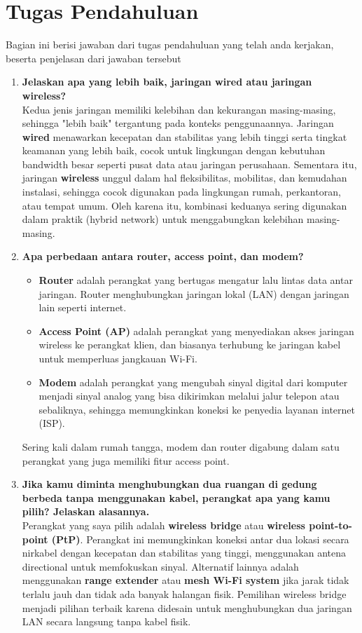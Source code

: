 \section{Tugas Pendahuluan}
Bagian ini berisi jawaban dari tugas pendahuluan yang telah anda kerjakan, beserta penjelasan dari jawaban tersebut
\begin{enumerate}
	\item \textbf{Jelaskan apa yang lebih baik, jaringan wired atau jaringan wireless?} \\
	Kedua jenis jaringan memiliki kelebihan dan kekurangan masing-masing, sehingga "lebih baik" tergantung pada konteks penggunaannya. Jaringan \textbf{wired} menawarkan kecepatan dan stabilitas yang lebih tinggi serta tingkat keamanan yang lebih baik, cocok untuk lingkungan dengan kebutuhan bandwidth besar seperti pusat data atau jaringan perusahaan. Sementara itu, jaringan \textbf{wireless} unggul dalam hal fleksibilitas, mobilitas, dan kemudahan instalasi, sehingga cocok digunakan pada lingkungan rumah, perkantoran, atau tempat umum. Oleh karena itu, kombinasi keduanya sering digunakan dalam praktik (hybrid network) untuk menggabungkan kelebihan masing-masing.

	\item \textbf{Apa perbedaan antara router, access point, dan modem?} \\
	\begin{itemize}
		\item \textbf{Router} adalah perangkat yang bertugas mengatur lalu lintas data antar jaringan. Router menghubungkan jaringan lokal (LAN) dengan jaringan lain seperti internet.
		\item \textbf{Access Point (AP)} adalah perangkat yang menyediakan akses jaringan wireless ke perangkat klien, dan biasanya terhubung ke jaringan kabel untuk memperluas jangkauan Wi-Fi.
		\item \textbf{Modem} adalah perangkat yang mengubah sinyal digital dari komputer menjadi sinyal analog yang bisa dikirimkan melalui jalur telepon atau sebaliknya, sehingga memungkinkan koneksi ke penyedia layanan internet (ISP).
	\end{itemize}
	Sering kali dalam rumah tangga, modem dan router digabung dalam satu perangkat yang juga memiliki fitur access point.

	\item \textbf{Jika kamu diminta menghubungkan dua ruangan di gedung berbeda tanpa menggunakan kabel, perangkat apa yang kamu pilih? Jelaskan alasannya.} \\
	Perangkat yang saya pilih adalah \textbf{wireless bridge} atau \textbf{wireless point-to-point (PtP)}. Perangkat ini memungkinkan koneksi antar dua lokasi secara nirkabel dengan kecepatan dan stabilitas yang tinggi, menggunakan antena directional untuk memfokuskan sinyal. Alternatif lainnya adalah menggunakan \textbf{range extender} atau \textbf{mesh Wi-Fi system} jika jarak tidak terlalu jauh dan tidak ada banyak halangan fisik. Pemilihan wireless bridge menjadi pilihan terbaik karena didesain untuk menghubungkan dua jaringan LAN secara langsung tanpa kabel fisik.
\end{enumerate}
